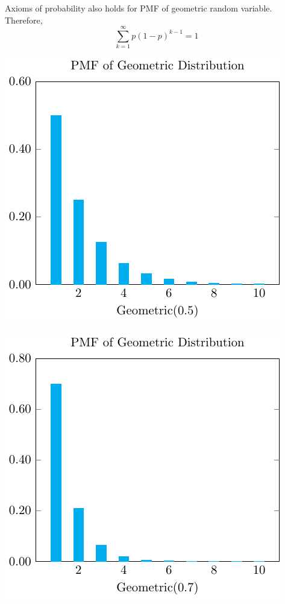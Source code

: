 Axioms of probability also holds for PMF of geometric random variable. Therefore, 
\[
  \sum_{k = 1}^{\infty} p(1 - p)^{k-1} = 1  
\]

\begin{minipage}{0.5\textwidth}
  \includegraphics{Figures/PMF_Geometric_05.pdf}
\end{minipage}
\begin{minipage}{0.5\textwidth}
  \includegraphics{Figures/PMF_Geometric_07.pdf}
\end{minipage}

